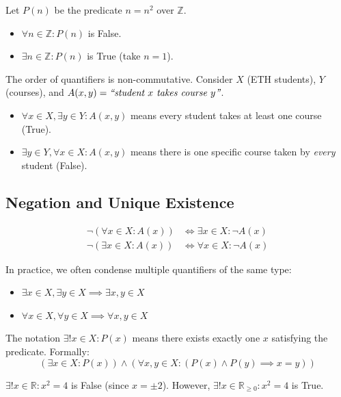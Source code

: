 \begin{example}
Let $P(n)$ be the predicate $n = n^2$ over $\mathbb{Z}$. 
\begin{itemize}
    \item $\forall n \in \mathbb{Z} : P(n)$ is False.
    \item $\exists n \in \mathbb{Z} : P(n)$ is True (take $n=1$).
\end{itemize}
\end{example}

\begin{importantremark}
The order of quantifiers is non-commutative. Consider $X$ (ETH students), $Y$ (courses), and $A(x,y) = \textit{``student $x$ takes course $y$''}$.
\begin{itemize}
    \item $\forall x \in X, \exists y \in Y : A(x,y)$ means every student takes at least one course (True).
    \item $\exists y \in Y, \forall x \in X : A(x,y)$ means there is one specific course taken by \textit{every} student (False).
\end{itemize}
\end{importantremark}

\subsection{Negation and Unique Existence}

\begin{proposition}
\begin{align*}
\neg (\forall x \in X : A(x)) &\iff \exists x \in X : \neg A(x) \\
\neg (\exists x \in X : A(x)) &\iff \forall x \in X : \neg A(x)
\end{align*}
\end{proposition}

\begin{remark}
In practice, we often condense multiple quantifiers of the same type:
\begin{itemize}
    \item $\exists x \in X, \exists y \in X \implies \exists x,y \in X$
    \item $\forall x \in X, \forall y \in X \implies \forall x,y \in X$
\end{itemize}
\end{remark}

\begin{definition}
The notation $\exists! x \in X : P(x)$ means there exists exactly one $x$ satisfying the predicate. Formally:
\[
(\exists x \in X : P(x)) \wedge (\forall x, y \in X : (P(x) \wedge P(y) \implies x = y))
\]
\end{definition}

\begin{example}
$\exists! x \in \mathbb{R} : x^2 = 4$ is False (since $x = \pm 2$). However, $\exists! x \in \mathbb{R}_{\ge 0} : x^2 = 4$ is True.
\end{example}